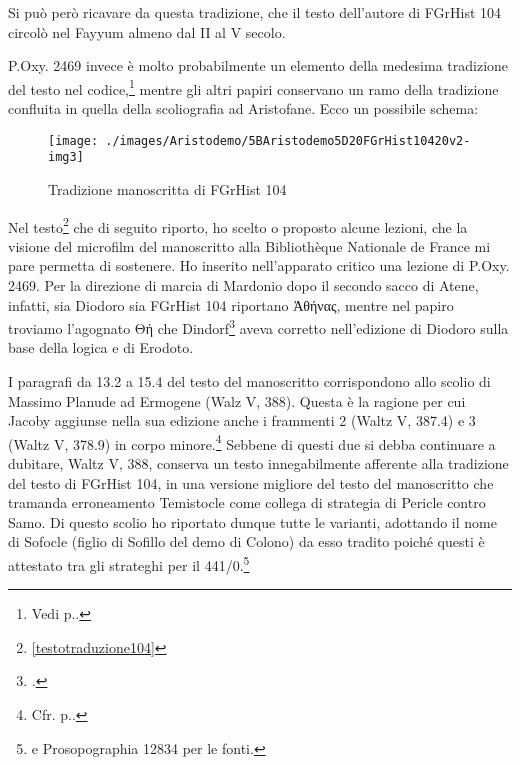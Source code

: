 Si può però ricavare da questa
tradizione, che il testo dell'autore di
FGrHist 104 circolò nel Fayyum almeno dal II al V
secolo.

P.Oxy. 2469 invece è molto
probabilmente un elemento della medesima tradizione del testo nel
codice,\footnote{Vedi
p.\pageref{bkm:RefHeading697951501267828}.}
mentre gli altri papiri conservano un ramo della tradizione confluita in
quella della scoliografia ad Aristofane. Ecco un possibile schema:

\begin{figure}[htbp]
\begin{center}
\texttt{[image: ./images/Aristodemo/5BAristodemo5D20FGrHist10420v2-img3]}
\caption{Tradizione manoscritta di FGrHist 104}
\label{tradizionemanoscr104}
\end{center}
\end{figure}


\clearpage
Nel testo\footnote{\ref{testotraduzione104}} che di seguito riporto, ho scelto o
proposto alcune lezioni, che la visione del
microfilm del manoscritto alla Bibliothèque
Nationale de France mi pare permetta di sostenere.
Ho inserito nell'apparato critico una lezione di P.Oxy.
2469. Per la direzione di marcia di
Mardonio dopo il secondo sacco di
Atene, infatti, sia Diodoro sia
FGrHist 104 riportano \textgreek{Ἀθήνας}, mentre
nel papiro troviamo l'agognato
\label{ref:cheDindorf}\textgreek{Θή} che
Dindorf\footnote{\cite[XIX-XXI]{Cohen-Skalli2012}.} aveva corretto nell'edizione di
Diodoro sulla base della logica e di Erodoto.


I paragrafi da 13.2 a 15.4 del testo
del manoscritto corrispondono allo scolio di Massimo Planude ad Ermogene
(Walz V, 388). Questa è la ragione per
cui Jacoby aggiunse nella sua edizione anche i
frammenti 2 (Waltz V, 387.4) e 3 (Waltz V, 378.9) in corpo minore.\footnote{Cfr. p.\pageref{bkm:waltzV388}.} Sebbene di questi due
si debba continuare a dubitare, Waltz V, 388, conserva un testo innegabilmente afferente alla tradizione del testo di FGrHist 104, in una versione migliore del testo del
manoscritto che tramanda erroneamento Temistocle come collega di strategia di Pericle contro Samo. Di questo scolio ho riportato dunque tutte le varianti,
adottando il nome di Sofocle (figlio di Sofillo del demo di Colono) da esso tradito poiché questi è attestato tra gli strateghi per il
441/0.\footnote{\cite[48]{Fornara1971} e Prosopographia 12834 per le
fonti.}

